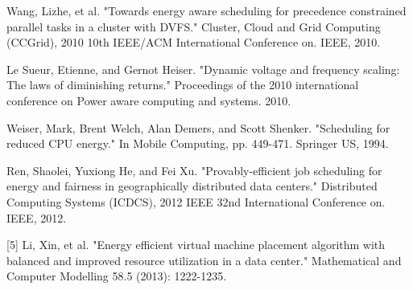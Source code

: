 \documentclass[conference]{IEEEtran}
\begin{document}







%
%
%
\begin{thebibliography}{1}

Wang, Lizhe, et al. "Towards energy aware scheduling for precedence constrained parallel tasks in a cluster with DVFS." Cluster, Cloud and Grid Computing (CCGrid), 2010 10th IEEE/ACM International Conference on. IEEE, 2010.

Le Sueur, Etienne, and Gernot Heiser. "Dynamic voltage and frequency scaling: The laws of diminishing returns." Proceedings of the 2010 international conference on Power aware computing and systems. 2010.

Weiser, Mark, Brent Welch, Alan Demers, and Scott Shenker. "Scheduling for reduced CPU energy." In Mobile Computing, pp. 449-471. Springer US, 1994.

Ren, Shaolei, Yuxiong He, and Fei Xu. "Provably-efficient job scheduling for energy and fairness in geographically distributed data centers." Distributed Computing Systems (ICDCS), 2012 IEEE 32nd International Conference on. IEEE, 2012.

[5] Li, Xin, et al. "Energy efficient virtual machine placement algorithm with balanced and improved resource utilization in a data center." Mathematical and Computer Modelling 58.5 (2013): 1222-1235.

\end{thebibliography}




\end{document}
